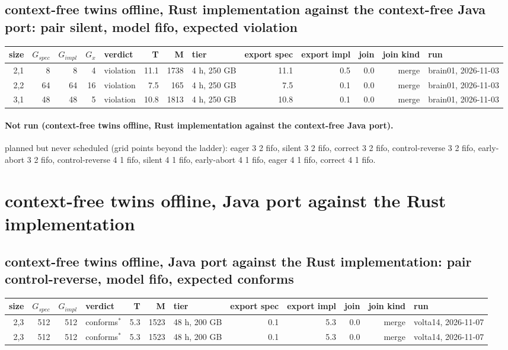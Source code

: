 \documentclass[10pt]{article}
\begin{document}
\subsection*{context-free twins offline, Rust implementation against the context-free Java port: pair \textsf{silent}, model fifo, expected violation}
\begin{longtable}{@{}rrrrlrrlrrrrl@{}}
\toprule
size & $G_{\mathit{spec}}$ & $G_{\mathit{impl}}$ & $G_x$ & verdict & T & M & tier & export spec & export impl & join & join kind & run \\
\midrule
\endhead
\color{blue} 2,1 & 8 & 8 & 4 & violation & 11.1 & 1738 & 4 h, 250 GB & 11.1 & 0.5 & 0.0 & merge & brain01, 2026-11-03 \\
\color{blue} 2,2 & 64 & 64 & 16 & violation & 7.5 & 165 & 4 h, 250 GB & 7.5 & 0.1 & 0.0 & merge & brain01, 2026-11-03 \\
\color{blue} 3,1 & 48 & 48 & 5 & violation & 10.8 & 1813 & 4 h, 250 GB & 10.8 & 0.1 & 0.0 & merge & brain01, 2026-11-03 \\
\bottomrule
\end{longtable}
\paragraph{Not run (context-free twins offline, Rust implementation against the context-free Java port).}
planned but never scheduled (grid points beyond the ladder): eager 3 2 fifo, silent 3 2 fifo, correct 3 2 fifo, control-reverse 3 2 fifo, early-abort 3 2 fifo, control-reverse 4 1 fifo, silent 4 1 fifo, early-abort 4 1 fifo, eager 4 1 fifo, correct 4 1 fifo.\par
\section*{context-free twins offline, Java port against the Rust implementation}
\subsection*{context-free twins offline, Java port against the Rust implementation: pair \textsf{control-reverse}, model fifo, expected conforms}
\begin{longtable}{@{}rrrlrrlrrrrl@{}}
\toprule
size & $G_{\mathit{spec}}$ & $G_{\mathit{impl}}$ & verdict & T & M & tier & export spec & export impl & join & join kind & run \\
\midrule
\endhead
\color{red} 2,3 & 512 & 512 & conforms$^{\ast}$ & 5.3 & 1523 & 48 h, 200 GB & 0.1 & 5.3 & 0.0 & merge & volta14, 2026-11-07 \\
\color{red} 2,3 & 512 & 512 & conforms$^{\ast}$ & 5.3 & 1523 & 48 h, 200 GB & 0.1 & 5.3 & 0.0 & merge & volta14, 2026-11-07 \\
\bottomrule
\end{longtable}
\end{document}
